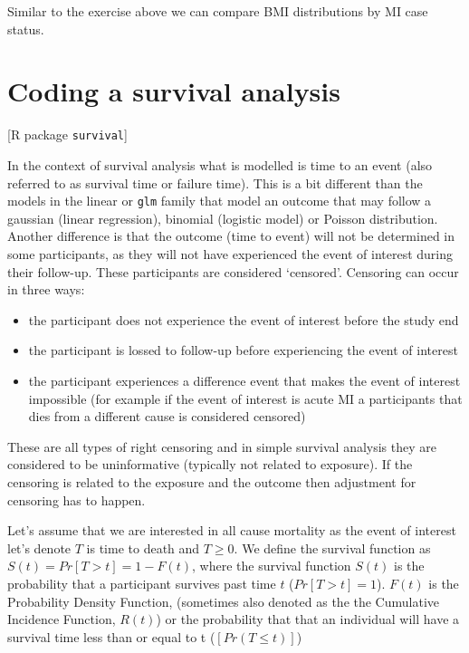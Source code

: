 \documentclass[
]{book}
\begin{document}
Similar to the exercise above we can compare BMI distributions by MI case status.

\hypertarget{coding-a-survival-analysis}{%
\section{Coding a survival analysis}\label{coding-a-survival-analysis}}

{[}R package \texttt{survival}{]}

In the context of survival analysis what is modelled is time to an event (also referred to as survival time or failure time). This is a bit different than the models in the linear or \texttt{glm} family that model an outcome that may follow a gaussian (linear regression), binomial (logistic model) or Poisson distribution. Another difference is that the outcome (time to event) will not be determined in some participants, as they will not have experienced the event of interest during their follow-up. These participants are considered `censored'. Censoring can occur in three ways:

\begin{itemize}
\item the participant does not experience the event of interest before the study end
\item the participant is lossed to follow-up before experiencing the event of interest
\item the participant experiences a difference event that makes the event of interest impossible (for example if the event of interest is acute MI a participants that dies from a different cause is considered censored)
\end{itemize}

These are all types of right censoring and in simple survival analysis they are considered to be uninformative (typically not related to exposure). If the censoring is related to the exposure and the outcome then adjustment for censoring has to happen.

Let's assume that we are interested in all cause mortality as the event of interest let's denote \(T\) is time to death and \(T\geq 0\). We define the survival function as
\(S(t)=Pr[T>t]=1-F(t)\), where the survival function \(S(t)\) is the probability that a participant survives past time \(t\) (\(Pr[T>t]=1\)). \(F(t)\) is the Probability Density Function, (sometimes also denoted as the the Cumulative Incidence Function, \(R(t)\)) or the probability that that an individual will have a survival time less than or equal to t (\([Pr(T≤t)]\))
\end{document}
